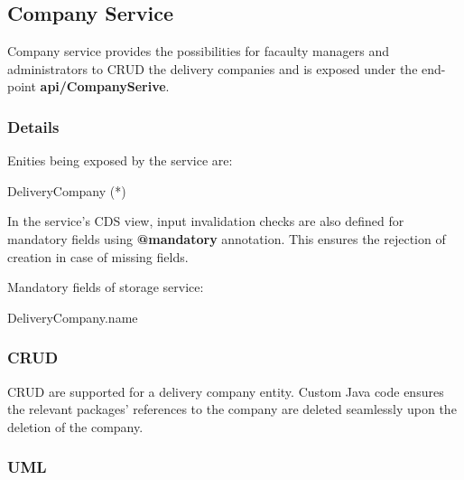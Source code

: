 \subsection{Company Service}
Company service provides the possibilities for facaulty managers and administrators to CRUD the delivery companies and is exposed under the end-point \textbf{api/CompanySerive}.

\subsubsection{Details}

Enities being exposed by the service are:
\begin{compactenum}
	\item DeliveryCompany (*)
\end{compactenum}

\bigskip
In the service's CDS view, input invalidation checks are also defined for mandatory fields using \textbf{@mandatory} annotation. This ensures the rejection of creation in case of missing fields. 

\bigskip
Mandatory fields of storage service:
\begin{compactenum}
	\item DeliveryCompany.name
\end{compactenum}

\subsubsection{CRUD}
CRUD are supported for a delivery company entity. Custom Java code ensures the relevant packages' references to the company are deleted seamlessly upon the deletion of the company.

\subsubsection{UML}

